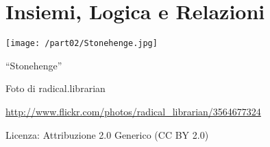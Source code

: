 \part{Insiemi, Logica e Relazioni}
\texttt{[image: /part02/Stonehenge.jpg]}
  \begin{center}
    {\large ``Stonehenge''}\par
    Foto di radical.librarian\par
    \url{http://www.flickr.com/photos/radical_librarian/3564677324}\par
    Licenza: Attribuzione 2.0 Generico (CC BY 2.0)\par
  \end{center}
\clearpage
\cleardoublepage
